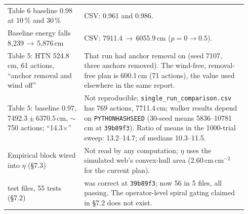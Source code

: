 \begin{table}[htbp]
\begin{tabular}{>{\raggedright\arraybackslash}p{0.30\linewidth}>{\raggedright\arraybackslash}p{0.64\linewidth}}
\addlinespace[3pt]
Table 6 baseline 0.98 at 10\,\% and 30\,\% & CSV: 0.961 and 0.986. \\
\addlinespace[3pt]
Baseline energy falls 8{,}239\,$\to$\,5{,}876\,cm & CSV: 7911.4\,$\to$\,6055.9\,cm ($p=0\to0.5$). \\
\addlinespace[3pt]
Table 5: HTN 524.8\,cm, 61 actions, ``anchor removal and wind off'' & That run had anchor removal on (seed 7107, three anchors removed). The wind-free, removal-free plan is 600.1\,cm (71 actions), the value used elsewhere in the same report. \\
\addlinespace[3pt]
Table 5: baseline $0.97$, $7492.3\pm6370.5$\,cm, $\sim$750 actions; ``14.3$\times$'' & Not reproducible; \texttt{single\_run\_comparison.csv} has 769 actions, 7711.4\,cm; walker results depend on \texttt{PYTHONHASHSEED} (30-seed means 5836--10781\,cm at \texttt{39b89f3}). Ratio of means in the 1000-trial sweep: 13.2--14.7; of medians 10.3--11.5. \\
\addlinespace[3pt]
Empirical block wired into $\eta$ (\S7.3) & Not read by any computation; $\eta$ uses the simulated web's convex-hull area (2.60\,cm\,cm$^{-2}$ for the current plan). \\
\addlinespace[3pt]
5 test files, 55 tests (\S7.2) & 55 was correct at \texttt{39b89f3}; now 56 in 5 files, all passing. The operator-level spiral gating claimed in \S7.2 does not exist. \\
\bottomrule
\end{tabular}
\end{table}
\FloatBarrier

